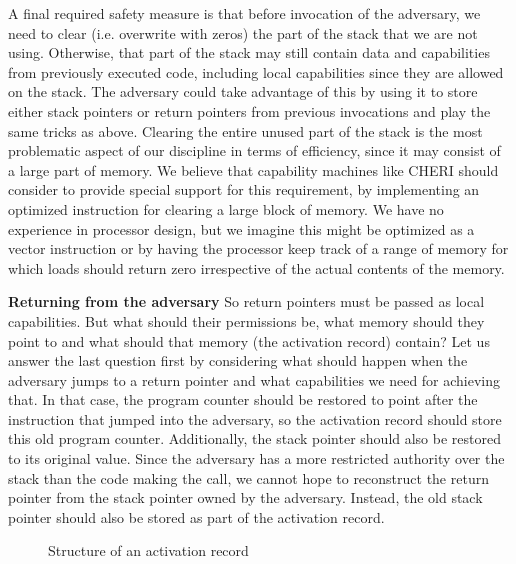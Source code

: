 \documentclass[compsoc,conference,letterpaper,fleqn]{IEEEtran}
\newcommand{\plainperm}[1]{\mathrm{#1}}
\newcommand{\entry}{\plainperm{e}}
\begin{document}
A final required safety measure is that before invocation of the adversary, we
need to clear (i.e. overwrite with zeros) the part of the stack that we are not
using. Otherwise, that part of the stack may still contain data and capabilities
from previously executed code, including local capabilities since they are
allowed on the stack. The adversary could take advantage of this by using it to
store either stack pointers or return pointers from previous invocations and
play the same tricks as above. Clearing the entire unused part of the stack is
the most problematic aspect of our discipline in terms of efficiency, since it
may consist of a large part of memory. We believe that capability machines like
CHERI should consider to provide special support for this requirement, by
implementing an optimized instruction for clearing
a large block of memory. We have no experience in processor design, but we
imagine this might be optimized as a vector instruction or by having the
processor keep track of a range of memory for which loads should return zero
irrespective of the actual contents of the memory.

\textbf{Returning from the adversary} So return pointers must be passed as local
capabilities. But what should their permissions be, what memory should they
point to and what should that memory (the activation record) contain? Let us
answer the last question first by considering what should happen when the
adversary jumps to a return pointer and what capabilities we need for achieving
that. In that case, the program counter should be restored to point after the
instruction that jumped into the adversary, so the activation record should
store this old program counter. Additionally, the stack pointer should also be
restored to its original value. Since the adversary has a more restricted
authority over the stack than the code making the call, we cannot hope to
reconstruct the return pointer from the stack pointer owned by the adversary.
Instead, the old stack pointer should also be stored as part of the activation
record.

\begin{figure}
  
  \caption{Structure of an activation record}
  \label{fig:activ-rec-struct}
\end{figure}
\end{document}
